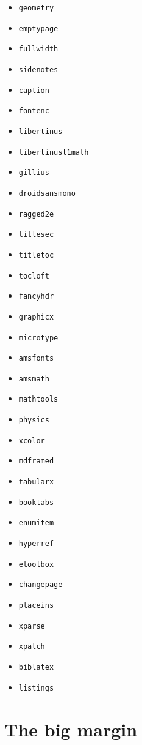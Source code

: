\documentclass[
    11pt,
]{tufte-style-thesis}
\begin{document}
\begin{wide}
\begin{multicols}{4}
\begin{itemize}
\item\texttt{geometry}
\item\texttt{emptypage}
\item\texttt{fullwidth}
\item\texttt{sidenotes}
\item\texttt{caption}
\item\texttt{fontenc}
\item\texttt{libertinus}
\item\texttt{libertinust1math}
\item\texttt{gillius}
\item\texttt{droidsansmono}
\item\texttt{ragged2e}
\item\texttt{titlesec}
\item\texttt{titletoc}
\item\texttt{tocloft}
\item\texttt{fancyhdr}
\item\texttt{graphicx} \item\texttt{microtype} \item\texttt{amsfonts} \item\texttt{amsmath} \item\texttt{mathtools} \item\texttt{physics} \item\texttt{xcolor} \item\texttt{mdframed} \item\texttt{tabularx} \item\texttt{booktabs} \item\texttt{enumitem} \item\texttt{hyperref} \item\texttt{etoolbox} \item\texttt{changepage} \item\texttt{placeins} \item\texttt{xparse} \item\texttt{xpatch} \item\texttt{biblatex} \item\texttt{listings}
\end{itemize}
\end{multicols}
\end{wide}

\section{The big margin}
\end{document}
